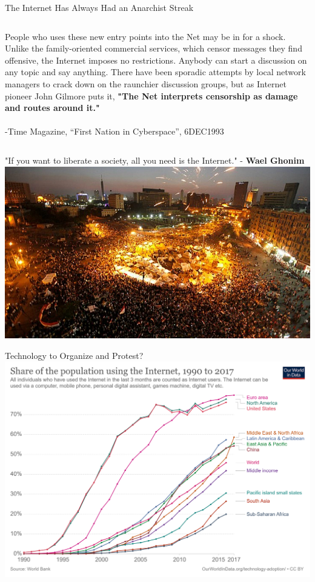 \documentclass[nobackground,dvipsnames,table,aspectratio=169]{beamer}
\begin{document}
\begin{frame}{The Internet Has Always Had an Anarchist Streak}
\begin{columns}[c]
            People who uses these new entry points into the Net may be in for a shock. Unlike the family-oriented commercial services, which censor messages they find offensive, the Internet imposes no restrictions. Anybody can start a discussion on any topic and say anything. There have been sporadic attempts by local network managers to crack down on the raunchier discussion groups, but as Internet pioneer John Gilmore puts it, \textbf{"The Net interprets censorship as damage and routes around it."}\\~\\
            
            -Time Magazine, “First Nation in Cyberspace”, 6DEC1993
    \end{columns}
\end{frame}

\begin{frame}{"If you want to liberate a society, all you need is the Internet." - \textbf{Wael Ghonim}}
    \includegraphics[width=\textwidth]{protest}
\end{frame}

\begin{frame}{Technology to Organize and Protest?}
    \includegraphics[width=\textwidth]{percent-using-internet}
\end{frame}
\end{document}
